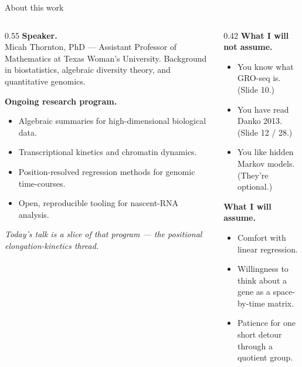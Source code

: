 \documentclass[aspectratio=169,11pt]{beamer}
\begin{document}
\begin{frame}{About this work}
\begin{columns}[T,onlytextwidth]
\begin{column}{0.55\textwidth}
  \vspace{0.2em}
  {\color{KGold}\bfseries\footnotesize Speaker.}\\[0.15em]
  {\color{KWhite}\footnotesize Micah Thornton, PhD --- Assistant Professor of
  Mathematics at Texas Woman's University. Background in biostatistics,
  algebraic diversity theory, and quantitative genomics.}

  {\color{KGold}\bfseries\footnotesize Ongoing research program.}
  \begin{itemize}
    \setlength{\itemsep}{0.15em}
    \item Algebraic summaries for high-dimensional biological data.
    \item Transcriptional kinetics and chromatin dynamics.
    \item Position-resolved regression methods for genomic time-courses.
    \item Open, reproducible tooling for nascent-RNA analysis.
  \end{itemize}
  {\color{KCream}\itshape\footnotesize Today's talk is a slice of that program ---
  the positional elongation-kinetics thread.}
\end{column}
\begin{column}{0.42\textwidth}
  \vspace{0.2em}
  {\color{KGold}\bfseries\footnotesize What I will not assume.}
  \begin{itemize}
    \setlength{\itemsep}{0.15em}
    \item You know what GRO-seq is. (Slide 10.)
    \item You have read Danko 2013. (Slide 12 / 28.)
    \item You like hidden Markov models. (They're optional.)
  \end{itemize}
  {\color{KGold}\bfseries\footnotesize What I will assume.}
  \begin{itemize}
    \setlength{\itemsep}{0.15em}
    \item Comfort with linear regression.
    \item Willingness to think about a gene as a space-by-time matrix.
    \item Patience for one short detour through a quotient group.
  \end{itemize}
\end{column}
\end{columns}
\end{frame}
\end{document}
